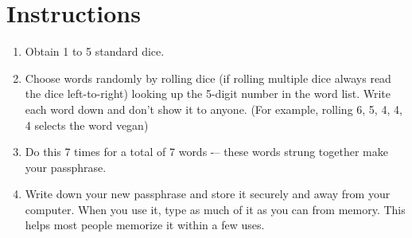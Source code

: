 \documentclass[10pt, oneside]{book}
\begin{document}
	\section*{Instructions}
	\begin{enumerate}
		\item Obtain 1 to 5 standard dice.\\
		\item Choose words randomly by rolling dice (if rolling multiple dice always read the dice left-to-right) looking up the 5-digit number in the word list. Write each word down and don't show it to anyone. (For example, rolling 6, 5, 4, 4, 4 selects the word vegan)\\
		\item Do this 7 times for a total of 7 words -– these words strung together make your passphrase.\\
		\item Write down your new passphrase and store it securely and away from your computer. When you use it, type as much of it as you can from memory. This helps most people memorize it within a few uses.\\
	\end{enumerate}
	\pagebreak
	
\end{document}

